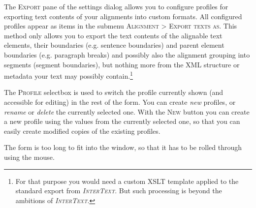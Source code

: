 \documentclass[a4paper,10pt,oneside]{book}
\newcommand{\IT}{\textit{\textsc{InterText}}\xspace}
\newcommand{\menu}[1]{\textsc{#1}}
\begin{document}
The \menu{Export} pane of the settings dialog allows you to configure profiles for exporting text contents of your alignments into custom formats. All configured profiles appear as items in the submenu \menu{Alignment} > \menu{Export texts as}. This method only allows you to export the text contents of the alignable text elements, their boundaries (e.g. sentence boundaries) and parent element boundaries (e.g. paragraph breaks) and possibly also the alignment grouping into segments (segment boundaries), but nothing more from the XML structure or metadata your text may possibly contain.\footnote{For that purpose you would need a custom XSLT template applied to the standard export from \IT. But such processing is beyond the ambitions of \IT.}

The \menu{Profile} selectbox is used to switch the profile currently shown (and accessible for editing) in the rest of the form. You can create \emph{new} profiles, or \emph{rename} or \emph{delete} the currently selected one. With the \menu{New} button you can create a new profile using the values from the currently selected one, so that you can easily create modified copies of the existing profiles.

The form is too long to fit into the window, so that it has to be rolled through using the mouse.
\end{document}
